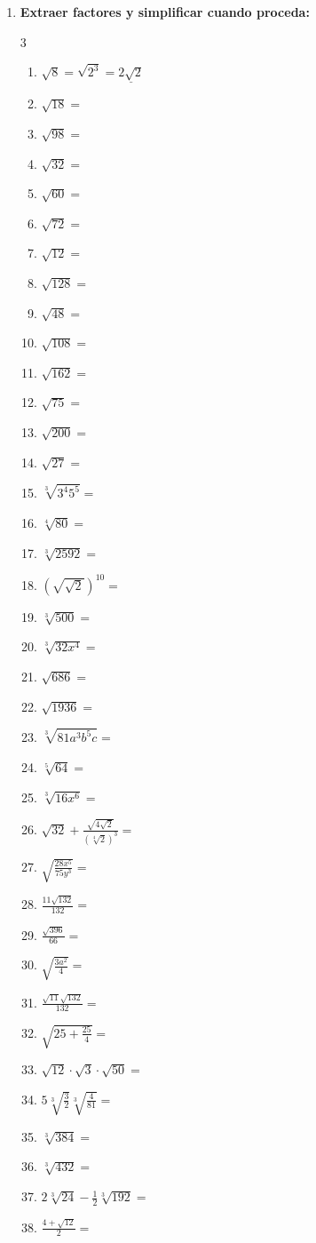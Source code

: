 \documentclass[a4paper,12pt]{article}
\begin{document}
\begin{enumerate}
    \item \textbf{Extraer factores y simplificar cuando proceda:}
    \begin{multicols}{3}
    \begin{enumerate}[label=\arabic*)]
        \item $\sqrt{8} = \sqrt{2^3} = \underline{2\sqrt{2}}$
        \item $\sqrt{18} =$
        \item $\sqrt{98} =$
        \item $\sqrt{32} =$
        \item $\sqrt{60} =$
        \item $\sqrt{72} =$
        \item $\sqrt{12} =$
        \item $\sqrt{128} =$
        \item $\sqrt{48} =$
        \item $\sqrt{108} =$
        \item $\sqrt{162} =$
        \item $\sqrt{75} =$
        \item $\sqrt{200} =$
        \item $\sqrt{27} =$
        \item $\sqrt[3]{3^4 5^5} =$
        \item $\sqrt[4]{80} =$
        \item $\sqrt[3]{2592} =$
        \item $(\sqrt{\sqrt{2}})^{10} =$
        \item $\sqrt[3]{500} =$
        \item $\sqrt[3]{32x^4} =$
        \item $\sqrt{686} =$
        \item $\sqrt{1936} =$
        \item $\sqrt[3]{81a^3 b^5 c} =$
        \item $\sqrt[5]{64} =$
        \item $\sqrt[3]{16x^6} =$
        \item $\sqrt{32} + \frac{\sqrt{4\sqrt{2}}}{(\sqrt[4]{2})^3} =$
        \item $\sqrt{\frac{28x^5}{75y^3}} =$
        \item $\frac{11\sqrt{132}}{132} =$
        \item $\frac{\sqrt{396}}{66} =$
        \item $\sqrt{\frac{3a^2}{4}} =$
        \item $\frac{\sqrt{11}\sqrt{132}}{132} =$
        \item $\sqrt{25 + \frac{25}{4}} =$
        \item $\sqrt{12}\cdot\sqrt{3}\cdot\sqrt{50} =$
        \item $5\sqrt[3]{\frac{3}{2}}\sqrt[3]{\frac{4}{81}} =$
        \item $\sqrt[3]{384} =$
        \item $\sqrt[3]{432} =$
        \item $2\sqrt[3]{24} - \frac{1}{2}\sqrt[3]{192} =$
        \item $\frac{4+\sqrt{12}}{2} =$
    \end{enumerate}
    \end{multicols}


\end{enumerate}
\end{document}

